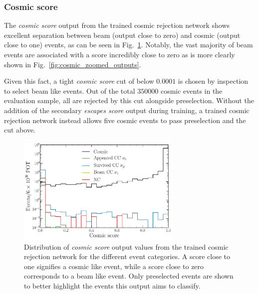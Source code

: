 \subsubsection*{Cosmic score} %

The \emph{cosmic score} output from the trained cosmic rejection network shows excellent
separation between beam (output close to zero) and cosmic (output close to one) events, as can be
seen in Fig.~\ref{fig:cosmic_outputs}. Notably, the vast majority of beam events are associated
with a score incredibly close to zero as is more clearly shown in
Fig.~\ref{fig:cosmic_zoomed_outputs}. 

Given this fact, a tight \emph{cosmic score} cut of below $0.0001$ is chosen by inspection to
select beam like events. Out of the total $350000$ cosmic events in the evaluation sample, all are
rejected by this cut alongside preselection. Without the addition of the secondary \emph{escapes
score} output during training, a trained cosmic rejection network instead allows five cosmic
events to pass preselection and the cut above.

\begin{figure} %
    \includegraphics[width=0.7\textwidth]{diagrams/7-results/final_cosmic_outputs.pdf}
    \caption[Distribution of cosmic score output values]
    {Distribution of \emph{cosmic score} output values from the trained cosmic rejection network
        for the different event categories. A score close to one signifies a cosmic like event,
        while a score close to zero corresponds to a beam like event. Only preselected events are
        shown to better highlight the events this output aims to classify.}
    \label{fig:cosmic_outputs}
\end{figure}

